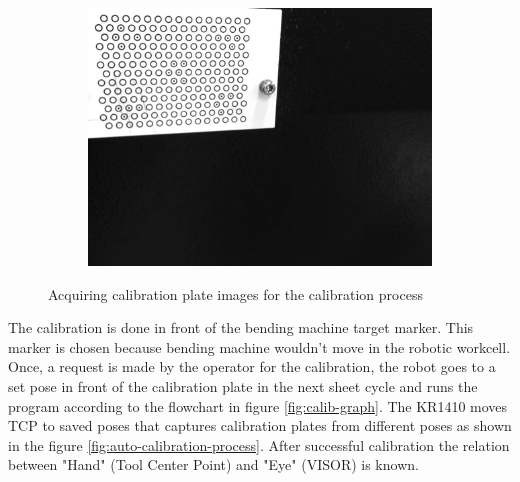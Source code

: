 \begin{figure}[h]
\begin{subfigure}{0.32\textwidth}
        \includegraphics[width=\textwidth]{figures/001calibration/calibration8.PNG}
    \end{subfigure}

    \caption{Acquiring calibration plate images for the calibration process}
    \label{fig:calibration-steps}
\end{figure}

The calibration is done in front of the bending machine target marker. This marker is chosen because bending machine wouldn't move in the robotic workcell. Once, a request is made by the operator for the calibration, the robot goes to a set pose in front of the calibration plate in the next sheet cycle and runs the program according to the flowchart in figure \ref{fig:calib-graph}. The KR1410 moves TCP to saved poses that captures calibration plates from different poses as shown in the figure \ref{fig:auto-calibration-process}. 
After successful calibration the relation between "Hand" (Tool Center Point) and "Eye" (VISOR) is known.

